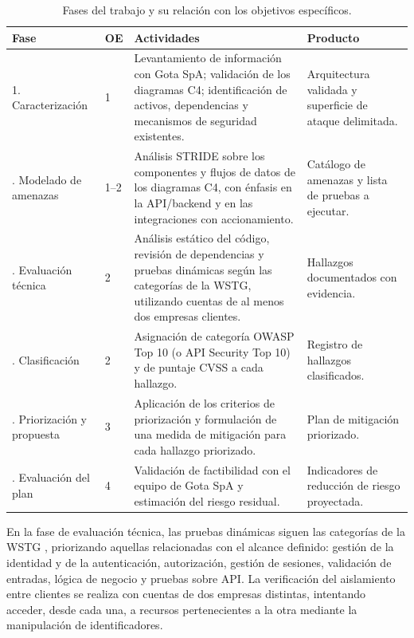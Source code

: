 \documentclass[12pt,letterpaper]{report}
\begin{document}
\begin{table}[htbp]
\centering
\small
\caption{Fases del trabajo y su relación con los objetivos específicos.}
\label{tab:fases}
\begin{tabular}{@{}p{2.6cm}p{1.4cm}p{7.2cm}p{4.3cm}@{}}
\toprule
\textbf{Fase} & \textbf{OE} & \textbf{Actividades} & \textbf{Producto} \\
\midrule
1. Caracterización & 1 &
Levantamiento de información con Gota SpA; validación de los diagramas C4;
identificación de activos, dependencias y mecanismos de seguridad existentes. &
Arquitectura validada y superficie de ataque delimitada. \\
\addlinespace
2. Modelado de amenazas & 1--2 &
Análisis STRIDE sobre los componentes y flujos de datos de los diagramas C4,
con énfasis en la API/backend y en las integraciones con accionamiento. &
Catálogo de amenazas y lista de pruebas a ejecutar. \\
\addlinespace
3. Evaluación técnica & 2 &
Análisis estático del código, revisión de dependencias y pruebas dinámicas
según las categorías de la WSTG, utilizando cuentas de al menos dos empresas
clientes. &
Hallazgos documentados con evidencia. \\
\addlinespace
4. Clasificación & 2 &
Asignación de categoría OWASP Top 10 (o API Security Top 10) y de puntaje CVSS
a cada hallazgo. &
Registro de hallazgos clasificados. \\
\addlinespace
5. Priorización y propuesta & 3 &
Aplicación de los criterios de priorización y formulación de una medida de
mitigación para cada hallazgo priorizado. &
Plan de mitigación priorizado. \\
\addlinespace
6. Evaluación del plan & 4 &
Validación de factibilidad con el equipo de Gota SpA y estimación del riesgo
residual. &
Indicadores de reducción de riesgo proyectada. \\
\bottomrule
\end{tabular}
\end{table}

En la fase de evaluación técnica, las pruebas dinámicas siguen las categorías
de la WSTG \autocite{owasp2024wstg}, priorizando aquellas relacionadas con el
alcance definido: gestión de la identidad y de la autenticación, autorización,
gestión de sesiones, validación de entradas, lógica de negocio y pruebas sobre
API. La verificación del aislamiento entre clientes se realiza con cuentas de
dos empresas distintas, intentando acceder, desde cada una, a recursos
pertenecientes a la otra mediante la manipulación de identificadores.
\end{document}
